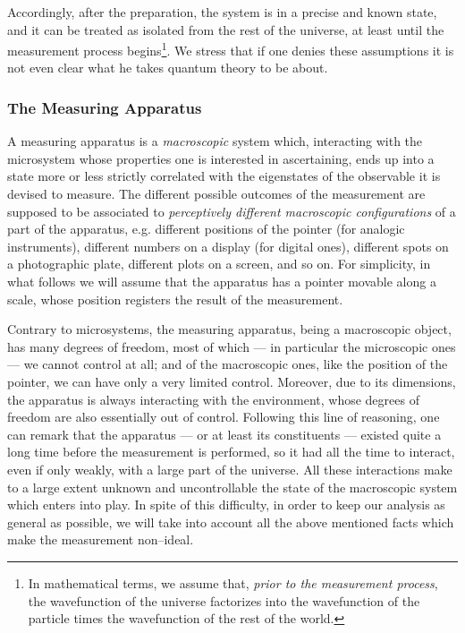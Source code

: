 \documentclass[12pt]{article}
\begin{document}
Accordingly, after the preparation, the system is in a precise and
known state, and it can be treated as isolated from the rest of
the universe, at least until  the measurement process
begins\footnote{In mathematical terms,  we assume that, {\it prior
to the measurement process},  the wavefunction of the universe
factorizes into the wavefunction of the particle times the
wavefunction of the rest of the world.}. We stress that if one
denies these assumptions it is not even clear what he takes
quantum theory to be about.


\subsubsection{The Measuring Apparatus} \label{sec222}

A measuring apparatus is a {\it macroscopic} system which,
interacting with the microsystem whose properties one is
interested in ascertaining, ends up into a state more or less
strictly correlated with the eigenstates of the observable it is
devised to measure. The different possible outcomes of the
measurement are supposed to be associated to {\it perceptively
different macroscopic configurations} of a part of the apparatus,
e.g. different positions of the pointer (for analogic
instruments), different numbers on a display (for digital ones),
different spots on a photographic plate, different plots on a
screen, and so on. For simplicity, in what follows we will assume
that the apparatus has a pointer  movable along a scale, whose
position registers the result of the measurement.

Contrary to microsystems, the measuring apparatus, being a
macroscopic object, has many degrees of freedom, most of which ---
in particular the microscopic ones --- we cannot control at all;
and of the macroscopic ones, like the position of the pointer, we
can have only a very limited control. Moreover, due to its
dimensions, the apparatus is always interacting with the
environment, whose degrees of freedom are also essentially out of
control. Following this line of reasoning, one can remark that the
apparatus --- or at least its constituents --- existed quite a
long time before the measurement is performed, so it had all the
time to interact, even if only weakly, with a large part of the
universe. All these interactions make to a large extent unknown
and uncontrollable the state of the macroscopic system which
enters into play. In spite of this difficulty, in order to keep
our analysis as general as possible, we will take into account all
the above mentioned facts which make the measurement non--ideal.
\end{document}
